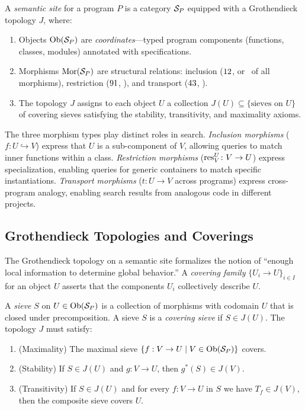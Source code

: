 \documentclass[11pt]{article}
\begin{document}
\begin{definition}\label{def:semantic-site}
A \emph{semantic site} for a program $P$ is a category $\mathcal{S}_P$
equipped with a Grothendieck topology $J$, where:
\begin{enumerate}[noitemsep]
  \item Objects $\mathrm{Ob}(\mathcal{S}_P)$ are \emph{coordinates}---typed program
        components (functions, classes, modules) annotated with
        specifications.
  \item Morphisms $\mathrm{Mor}(\mathcal{S}_P)$ are structural relations: inclusion
        ($12$, or \compMorphInclusionPct\ of all
        morphisms), restriction ($91$,
        \compMorphRestrictionPct), and transport ($43$,
        \compMorphTransportPct).
  \item The topology $J$ assigns to each object $U$ a collection
        $J(U) \subseteq \{\text{sieves on } U\}$ of covering sieves
        satisfying the stability, transitivity, and maximality axioms.
\end{enumerate}
\end{definition}

The three morphism types play distinct roles in search.  \emph{Inclusion
morphisms} ($f \colon U \hookrightarrow V$) express that $U$ is a
sub-component of $V$, allowing queries to match inner functions within a
class.  \emph{Restriction morphisms} ($\mathrm{res}_{V}^{U} \colon V \to U$)
express specialization, enabling queries for generic containers to match
specific instantiations.  \emph{Transport morphisms} ($t \colon U \to V$
across programs) express cross-program analogy, enabling search results
from analogous code in different projects.

\subsection{Grothendieck Topologies and Coverings}
The Grothendieck topology on a semantic site formalizes the notion of
``enough local information to determine global behavior.''  A
\emph{covering family} $\{U_i \to U\}_{i \in I}$ for an object $U$
asserts that the components $U_i$ collectively describe $U$.

\begin{definition}\label{def:covering-sieve}
A \emph{sieve} $S$ on $U \in \mathrm{Ob}(\mathcal{S}_P)$ is a collection of morphisms
with codomain $U$ that is closed under precomposition.  A sieve $S$ is a
\emph{covering sieve} if $S \in J(U)$.  The topology $J$ must satisfy:
\begin{enumerate}[noitemsep]
  \item (Maximality) The maximal sieve $\{f : V \to U \mid V \in \mathrm{Ob}(\mathcal{S}_P)\}$ covers.
  \item (Stability) If $S \in J(U)$ and $g \colon V \to U$, then
        $g^{*}(S) \in J(V)$.
  \item (Transitivity) If $S \in J(U)$ and for every $f \colon V \to U$
        in $S$ we have $T_f \in J(V)$, then the composite sieve covers $U$.
\end{enumerate}
\end{definition}
\end{document}
